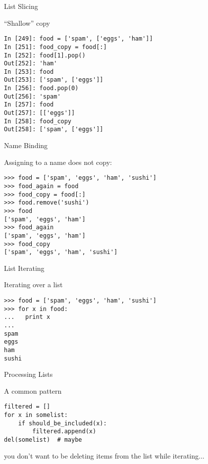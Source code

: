 \documentclass{beamer}
\begin{document}
\begin{frame}[fragile]{List Slicing}

{\Large ``Shallow'' copy}

\begin{verbatim}
In [249]: food = ['spam', ['eggs', 'ham']]
In [251]: food_copy = food[:]
In [252]: food[1].pop()
Out[252]: 'ham'
In [253]: food
Out[253]: ['spam', ['eggs']]
In [256]: food.pop(0)
Out[256]: 'spam'
In [257]: food
Out[257]: [['eggs']]
In [258]: food_copy
Out[258]: ['spam', ['eggs']]
\end{verbatim}

\end{frame} 

\begin{frame}[fragile]{Name Binding}

{\Large Assigning to a name does not copy:}

\begin{verbatim}
>>> food = ['spam', 'eggs', 'ham', 'sushi']
>>> food_again = food
>>> food_copy = food[:]
>>> food.remove('sushi')
>>> food
['spam', 'eggs', 'ham']
>>> food_again
['spam', 'eggs', 'ham']
>>> food_copy
['spam', 'eggs', 'ham', 'sushi']
\end{verbatim}

\end{frame} 

\begin{frame}[fragile]{List Iterating}

{\Large Iterating over a list}

\begin{verbatim}
>>> food = ['spam', 'eggs', 'ham', 'sushi']
>>> for x in food:
...   print x
...
spam
eggs
ham
sushi
\end{verbatim}

\end{frame} 

\begin{frame}[fragile]{Processing Lists}

{\Large A common pattern}

\begin{verbatim}
filtered = []
for x in somelist:
    if should_be_included(x):
        filtered.append(x)
del(somelist)  # maybe
\end{verbatim}

{\Large you don't want to be deleting items from the list while iterating...}

\end{frame} 
\end{document}
